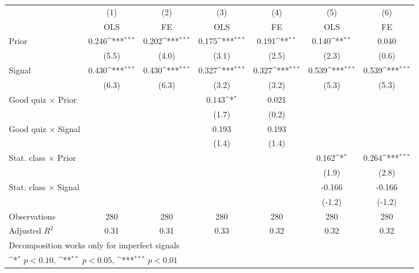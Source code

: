 {
\def\sym#1{\ifmmode^{#1}\else\(^{#1}\)\fi}
\begin{tabular}{l*{6}{c}}
\hline\hline
                &\multicolumn{1}{c}{(1)}&\multicolumn{1}{c}{(2)}&\multicolumn{1}{c}{(3)}&\multicolumn{1}{c}{(4)}&\multicolumn{1}{c}{(5)}&\multicolumn{1}{c}{(6)}\\
                &\multicolumn{1}{c}{OLS}&\multicolumn{1}{c}{FE}&\multicolumn{1}{c}{OLS}&\multicolumn{1}{c}{FE}&\multicolumn{1}{c}{OLS}&\multicolumn{1}{c}{FE}\\
\hline
Prior           &    0.246\sym{***}&    0.202\sym{***}&    0.175\sym{***}&    0.191\sym{**} &    0.140\sym{**} &    0.040         \\
                &    (5.5)         &    (4.0)         &    (3.1)         &    (2.5)         &    (2.3)         &    (0.6)         \\
Signal          &    0.430\sym{***}&    0.430\sym{***}&    0.327\sym{***}&    0.327\sym{***}&    0.539\sym{***}&    0.539\sym{***}\\
                &    (6.3)         &    (6.3)         &    (3.2)         &    (3.2)         &    (5.3)         &    (5.3)         \\
Good quiz $\times$ Prior&                  &                  &    0.143\sym{*}  &    0.021         &                  &                  \\
                &                  &                  &    (1.7)         &    (0.2)         &                  &                  \\
Good quiz $\times$ Signal&                  &                  &    0.193         &    0.193         &                  &                  \\
                &                  &                  &    (1.4)         &    (1.4)         &                  &                  \\
Stat. class $\times$ Prior&                  &                  &                  &                  &    0.162\sym{*}  &    0.264\sym{***}\\
                &                  &                  &                  &                  &    (1.9)         &    (2.8)         \\
Stat. class $\times$ Signal&                  &                  &                  &                  &   -0.166         &   -0.166         \\
                &                  &                  &                  &                  &   (-1.2)         &   (-1.2)         \\
\hline
Observations    &      280         &      280         &      280         &      280         &      280         &      280         \\
Adjusted \(R^{2}\)&     0.31         &     0.31         &     0.33         &     0.32         &     0.32         &     0.32         \\
\hline\hline
\multicolumn{7}{l}{\footnotesize Decomposition works only for imperfect signals}\\
\multicolumn{7}{l}{\footnotesize \sym{*} \(p<0.10\), \sym{**} \(p<0.05\), \sym{***} \(p<0.01\)}\\
\end{tabular}
}
